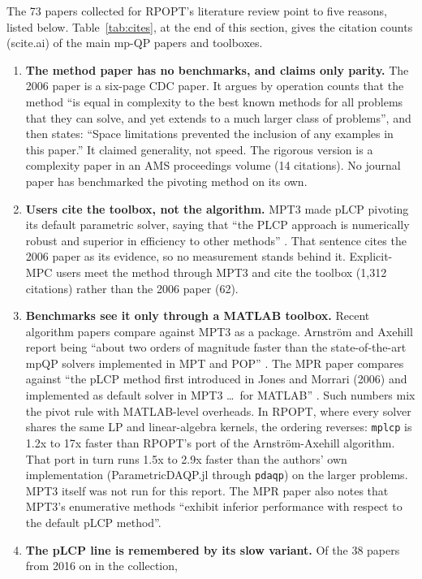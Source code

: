 \documentclass[11pt]{article}
\newcommand{\code}[1]{\texttt{#1}}
\begin{document}
The 73 papers collected for RPOPT's literature review point to five reasons, listed below.
Table~\ref{tab:cites}, at the end of this section, gives the citation counts (scite.ai) of the main mp-QP papers
and toolboxes.

\begin{enumerate}
  \item \textbf{The method paper has no benchmarks, and claims only parity.} The 2006 paper is a six-page CDC paper.
  It argues by operation counts that the method ``is equal in complexity to the best known methods for all problems
  that they can solve, and yet extends to a much larger class of problems'', and then states: ``Space limitations
  prevented the inclusion of any examples in this paper.'' It claimed generality, not speed. The rigorous version
  \cite{columbano2009} is a complexity paper in an AMS proceedings volume (14 citations). No journal paper has
  benchmarked the pivoting method on its own.
  \item \textbf{Users cite the toolbox, not the algorithm.} MPT3 made pLCP pivoting its default parametric solver,
  saying that ``the PLCP approach is numerically robust and superior in efficiency to other methods'' \cite{mpt3}.
  That sentence cites the 2006 paper as its evidence, so no measurement stands behind it. Explicit-MPC users meet
  the method through MPT3 and cite the toolbox (1,312 citations) rather than the 2006 paper (62).
  \item \textbf{Benchmarks see it only through a MATLAB toolbox.} Recent algorithm papers compare against MPT3 as a
  package. Arnstr\"om and Axehill report being ``about two orders of magnitude faster than the state-of-the-art
  mpQP solvers implemented in MPT and POP'' \cite{arnstrom2024}. The MPR paper compares against ``the pLCP method
  first introduced in Jones and Morrari (2006) and implemented as default solver in MPT3 \ldots\ for MATLAB''
  \cite{falsone2026}. Such numbers mix the pivot rule with MATLAB-level overheads. In RPOPT, where every solver
  shares the same LP and linear-algebra kernels, the ordering reverses: \code{mplcp} is 1.2x to 17x faster than
  RPOPT's port of the Arnstr\"om-Axehill algorithm. That port in turn runs 1.5x to 2.9x faster than the authors'
  own implementation (ParametricDAQP.jl through \code{pdaqp}) on the larger problems. MPT3 itself was not run for
  this report. The MPR paper also notes that MPT3's enumerative methods ``exhibit inferior performance with respect
  to the default pLCP method''.
  \item \textbf{The pLCP line is remembered by its slow variant.} Of the 38 papers from 2016 on in the collection,

\end{enumerate}
\end{document}
